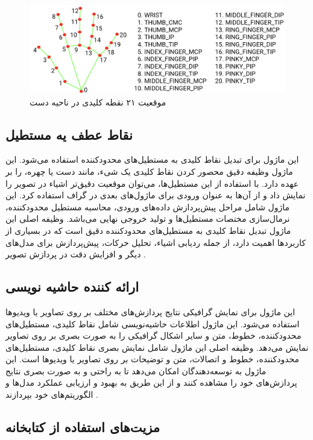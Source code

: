 \begin{figure}[h]
    \centering
    \includegraphics[width=1\textwidth]{hand-landmarks.png}
    \caption{موقعیت ۲۱ نقطه کلیدی در ناحیه دست}
\end{figure}



\subsection{نقاط عطف یه مستطیل \protect{}}
این ماژول برای تبدیل نقاط کلیدی به مستطیل‌های محدودکننده استفاده می‌شود. این ماژول وظیفه دقیق محصور کردن نقاط کلیدی یک شیء، مانند دست یا چهره، را بر عهده دارد. با استفاده از این مستطیل‌ها، می‌توان موقعیت دقیق‌تر اشیاء در 
تصویر را نمایش داد و از آن‌ها به عنوان ورودی برای ماژول‌های بعدی در گراف استفاده کرد. این ماژول شامل مراحل پیش‌پردازش داده‌های ورودی، محاسبه مستطیل محدودکننده، نرمال‌سازی مختصات مستطیل‌ها و تولید خروجی نهایی 
می‌باشد. وظیفه اصلی این ماژول تبدیل نقاط کلیدی به مستطیل‌های محدودکننده دقیق است که در بسیاری از کاربردها اهمیت دارد، از جمله ردیابی اشیاء، تحلیل حرکات، پیش‌پردازش برای مدل‌های دیگر و افزایش دقت در پردازش تصویر .
\cite{zhang2020mediapipe}


\subsection{ارائه کننده حاشیه نویسی \protect{}}
این ماژول برای نمایش گرافیکی نتایج پردازش‌های مختلف بر روی تصاویر یا ویدیوها استفاده می‌شود. این ماژول اطلاعات حاشیه‌نویسی شامل نقاط کلیدی، مستطیل‌های محدودکننده، خطوط، متن و سایر اشکال گرافیکی را به صورت 
بصری بر روی تصاویر نمایش می‌دهد. وظیفه اصلی این ماژول شامل نمایش بصری نقاط کلیدی، مستطیل‌های محدودکننده، خطوط و اتصالات، متن و توضیحات بر روی تصاویر یا ویدیوها است. این ماژول به توسعه‌دهندگان امکان 
می‌دهد تا به راحتی و به صورت بصری نتایج پردازش‌های خود را مشاهده کنند و از این طریق به بهبود و ارزیابی عملکرد مدل‌ها و الگوریتم‌های خود بپردازند .
\cite{zhang2020mediapipe}

\subsection{مزیت‌های استفاده از کتابخانه }













